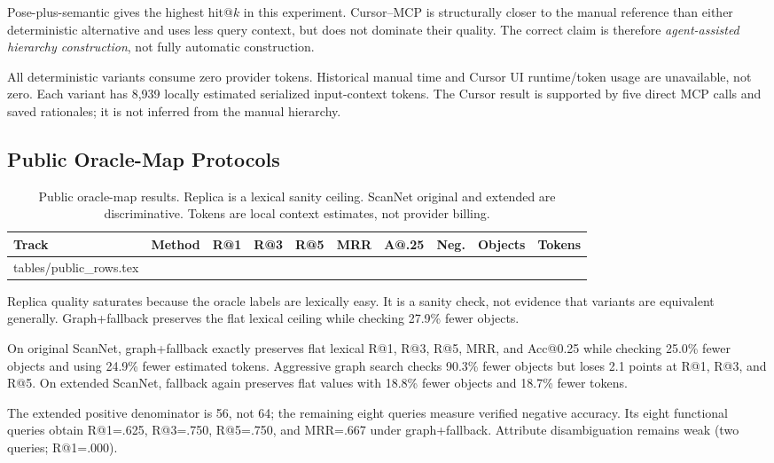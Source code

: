 \documentclass[10pt,twocolumn,letterpaper]{article}
\makeatletter
\newcommand{\tableinput}[1]{\@@input #1 }
\newcommand{\tableformat}{%
  \renewcommand{\arraystretch}{1.10}%
  \setlength{\tabcolsep}{4pt}%
}
\makeatother
\begin{document}
Pose-plus-semantic gives the highest hit@$k$ in this experiment. Cursor--MCP is
structurally closer to the manual reference than either deterministic
alternative and uses less query context, but does not dominate their quality.
The correct claim is therefore \emph{agent-assisted hierarchy construction},
not fully automatic construction.

All deterministic variants consume zero provider tokens. Historical manual
time and Cursor UI runtime/token usage are unavailable, not zero. Each variant
has 8,939 locally estimated serialized input-context tokens. The Cursor result
is supported by five direct MCP calls and saved rationales; it is not inferred
from the manual hierarchy.

\subsection{Public Oracle-Map Protocols}
\begin{table}[t]
\centering
\caption{Public oracle-map results. Replica is a lexical sanity ceiling.
ScanNet original and extended are discriminative. Tokens are local context
estimates, not provider billing.}
\label{tab:public}
\footnotesize
\tableformat
\setlength{\tabcolsep}{3.8pt}
\begin{tabular}{@{}llrrrrrrrr@{}}
\toprule
\textbf{Track} & \textbf{Method} & \textbf{R@1} & \textbf{R@3} &
\textbf{R@5} & \textbf{MRR} & \textbf{A@.25} & \textbf{Neg.} &
\textbf{Objects} & \textbf{Tokens} \\
\midrule
\tableinput{tables/public_rows.tex}
\bottomrule
\end{tabular}
\end{table}

Replica quality saturates because the oracle labels are lexically easy. It is
a sanity check, not evidence that variants are equivalent generally.
Graph+fallback preserves the flat lexical ceiling while checking 27.9\% fewer
objects.

On original ScanNet, graph+fallback exactly preserves flat lexical R@1, R@3,
R@5, MRR, and Acc@0.25 while checking 25.0\% fewer objects and using 24.9\%
fewer estimated tokens. Aggressive graph search checks 90.3\% fewer objects but
loses 2.1 points at R@1, R@3, and R@5. On extended ScanNet, fallback again
preserves flat values with 18.8\% fewer objects and 18.7\% fewer tokens.

The extended positive denominator is 56, not 64; the remaining eight queries
measure verified negative accuracy. Its eight functional queries obtain
R@1=.625, R@3=.750, R@5=.750, and MRR=.667 under graph+fallback. Attribute
disambiguation remains weak (two queries; R@1=.000).
\end{document}
